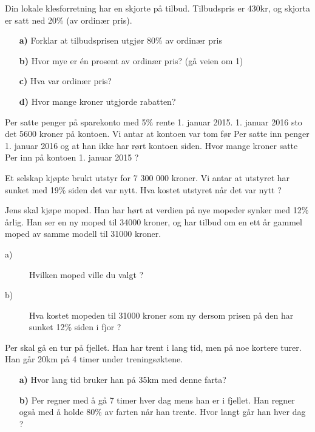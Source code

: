 \documentclass[a4, 11pt, twoside]{article}
\theoremstyle{definition}
\begin{document}
\begin{Exercise}
Din lokale klesforretning har en skjorte på tilbud. Tilbudspris er
430kr, og skjorta er satt ned 20\% (av ordinær pris).
\begin{itemize}
\item[\bf a)] Forklar at tilbudsprisen utgjør 80\% av ordinær pris
\item[\bf b)] Hvor mye er én prosent av ordinær pris? (gå veien om 1)
\item[\bf c)] Hva var ordinær pris?
\item[\bf d)] Hvor mange kroner utgjorde rabatten?
\end{itemize}
\end{Exercise}


\begin{Exercise}
    Per satte penger på sparekonto med 5\% rente 1. januar 2015.
    1. januar 2016 sto det 5600 kroner på kontoen. Vi antar at
    kontoen var tom før Per satte inn penger 1. januar 2016 og at
    han ikke har rørt kontoen siden. \newline 
    Hvor mange kroner satte Per inn på kontoen 1. januar 2015 ?
\end{Exercise}

\begin{Exercise}
    Et selskap kjøpte brukt utstyr for 7 300 000 kroner. Vi antar
    at utstyret har sunket med 19\% siden det var nytt. 
    \newline
    Hva kostet utstyret når det var nytt ?
\end{Exercise}

\begin{Exercise}
    Jens skal kjøpe moped. Han har hørt at verdien på nye mopeder synker med
    12\% årlig. Han ser en ny moped til 34000 kroner, og har tilbud om en ett år gammel 
    moped av samme modell til 31000 kroner.
    \begin{description}
        \item[a)] Hvilken moped ville du valgt ?
        \item[b)] Hva kostet mopeden til 31000 kroner som ny dersom prisen på den har sunket 12\% siden i fjor ?
    \end{description}
\end{Exercise}

\begin{Exercise}
Per skal gå en tur på fjellet. Han har trent i lang tid, men på noe
kortere turer. Han går 20km på 4 timer under treningsøktene.
\begin{itemize}
\item[\bf a)] Hvor lang tid bruker han på 35km med denne farta?
\item[\bf b)] Per regner med å gå 7 timer hver dag mens han er i fjellet.
    Han regner også med å holde 80\% av farten når han trente. Hvor langt
        går han hver dag ?
\end{itemize}
\end{Exercise}
\end{document}
